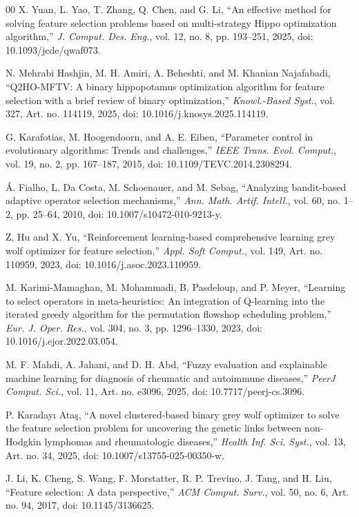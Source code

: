 \begin{thebibliography}{00}
 X. Yuan, L. Yao, T. Zhang, Q. Chen, and G. Li, ``An effective method for solving feature selection problems based on multi-strategy Hippo optimization algorithm,'' \textit{J. Comput. Des. Eng.}, vol. 12, no. 8, pp. 193--251, 2025, doi: 10.1093/jcde/qwaf073.

 N. Mehrabi Hashjin, M. H. Amiri, A. Beheshti, and M. Khanian Najafabadi, ``Q2HO-MFTV: A binary hippopotamus optimization algorithm for feature selection with a brief review of binary optimization,'' \textit{Knowl.-Based Syst.}, vol. 327, Art. no. 114119, 2025, doi: 10.1016/j.knosys.2025.114119.

 G. Karafotias, M. Hoogendoorn, and A. E. Eiben, ``Parameter control in evolutionary algorithms: Trends and challenges,'' \textit{IEEE Trans. Evol. Comput.}, vol. 19, no. 2, pp. 167--187, 2015, doi: 10.1109/TEVC.2014.2308294.

 \'A. Fialho, L. Da Costa, M. Schoenauer, and M. Sebag, ``Analyzing bandit-based adaptive operator selection mechanisms,'' \textit{Ann. Math. Artif. Intell.}, vol. 60, no. 1--2, pp. 25--64, 2010, doi: 10.1007/s10472-010-9213-y.

 Z. Hu and X. Yu, ``Reinforcement learning-based comprehensive learning grey wolf optimizer for feature selection,'' \textit{Appl. Soft Comput.}, vol. 149, Art. no. 110959, 2023, doi: 10.1016/j.asoc.2023.110959.

 M. Karimi-Mamaghan, M. Mohammadi, B. Pasdeloup, and P. Meyer, ``Learning to select operators in meta-heuristics: An integration of Q-learning into the iterated greedy algorithm for the permutation flowshop scheduling problem,'' \textit{Eur. J. Oper. Res.}, vol. 304, no. 3, pp. 1296--1330, 2023, doi: 10.1016/j.ejor.2022.03.054.

 M. F. Mahdi, A. Jahani, and D. H. Abd, ``Fuzzy evaluation and explainable machine learning for diagnosis of rheumatic and autoimmune diseases,'' \textit{PeerJ Comput. Sci.}, vol. 11, Art. no. e3096, 2025, doi: 10.7717/peerj-cs.3096.

 P. Karaday{\i} Ata\c{s}, ``A novel clustered-based binary grey wolf optimizer to solve the feature selection problem for uncovering the genetic links between non-Hodgkin lymphomas and rheumatologic diseases,'' \textit{Health Inf. Sci. Syst.}, vol. 13, Art. no. 34, 2025, doi: 10.1007/s13755-025-00350-w.

 J. Li, K. Cheng, S. Wang, F. Morstatter, R. P. Trevino, J. Tang, and H. Liu, ``Feature selection: A data perspective,'' \textit{ACM Comput. Surv.}, vol. 50, no. 6, Art. no. 94, 2017, doi: 10.1145/3136625.


\end{thebibliography}
